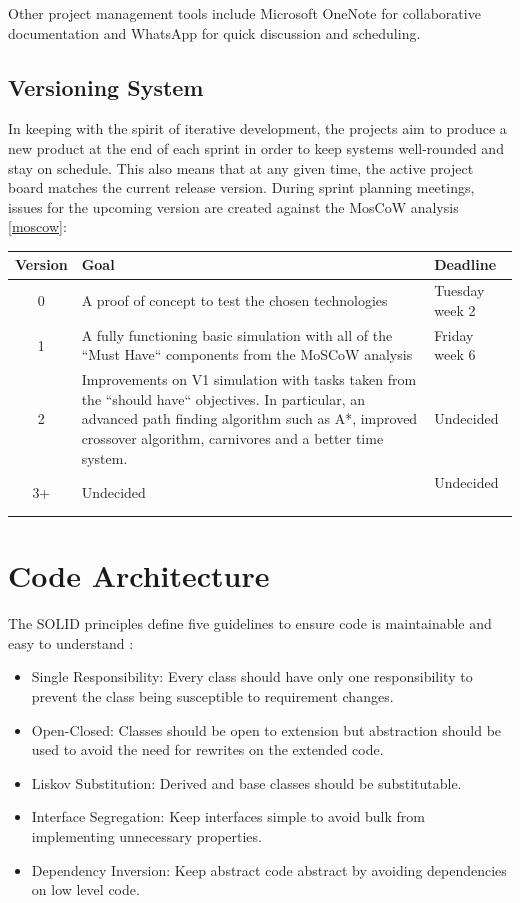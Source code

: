 \documentclass[a4paper, oneside, 11pt]{report}
\begin{document}
Other project management tools include Microsoft OneNote for collaborative documentation and WhatsApp for quick discussion and scheduling.

\subsection{Versioning System}\label{versioning}
In keeping with the spirit of iterative development, the projects aim to produce a new product at the end of each sprint in order to keep systems well-rounded and stay on schedule. This also means that at any given time, the active project board matches the current release version. During sprint planning meetings, issues for the upcoming version are created against the MosCoW analysis \ref{moscow}:

\smallskip 
\begin{tabular}{c|p{}|l}
	Version & Goal & Deadline \\ \hline
	0 & A proof of concept to test the chosen technologies & Tuesday week 2 \\ \hline
	1 & A fully functioning basic simulation with all of the ``Must Have`` components from the MoSCoW analysis & Friday week 6 \\ \hline
	2 & Improvements on V1 simulation with tasks taken from the ``should have`` objectives. In particular, an advanced path finding algorithm such as A*, improved crossover algorithm, carnivores and a better time system. & Undecided \\ \hline
	3+ & Undecided & Undecided \
\end{tabular}
\smallskip 

\section{Code Architecture}\label{architecture}
The SOLID principles define five guidelines to ensure code is maintainable and easy to understand \cite{kelmendi}: 
\begin{itemize}
	\item Single Responsibility: Every class should have only one responsibility to prevent the class being susceptible to requirement changes.
	\item Open-Closed: Classes should be open to extension but abstraction should be used to avoid the need for rewrites on the extended code.
	\item Liskov Substitution: Derived and base classes should be substitutable.
	\item Interface Segregation: Keep interfaces simple to avoid bulk from implementing unnecessary properties.
	\item Dependency Inversion: Keep abstract code abstract by avoiding dependencies on low level code.
\end{itemize}
\end{document}
